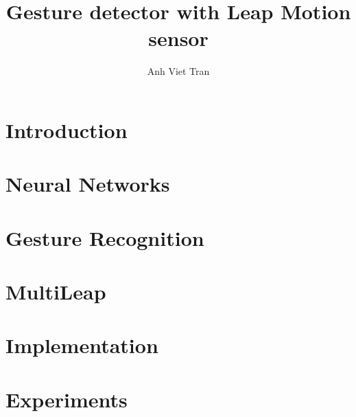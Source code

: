\documentclass[thesis=B,english]{FITthesis}[2020/10/23]
\title{Gesture detector with Leap Motion sensor}
\author{Anh Viet Tran} %
\begin{document}
	\chapter{Introduction}\label{ch:introduction}
	\newpage\cleardoublepage
	\chapter{Neural Networks}\label{ch:neural_network}
	\newpage\cleardoublepage
	\chapter{Gesture Recognition}\label{ch:gesture_recognition}
	\newpage\cleardoublepage
	\chapter{MultiLeap}\label{ch:multileap}
	\newpage\cleardoublepage
	\chapter{Implementation}\label{ch:implementation}
	\newpage\cleardoublepage
	\chapter{Experiments}\label{ch:experiments}
	\newpage\cleardoublepage
\end{document}
